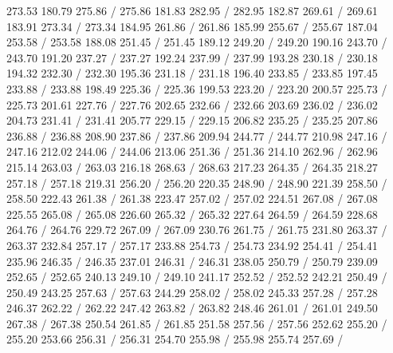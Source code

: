 { 273.53 180.79 275.86 /
 275.86 181.83 282.95 /
 282.95 182.87 269.61 /
 269.61 183.91 273.34 /
 273.34 184.95 261.86 /
 261.86 185.99 255.67 /
 255.67 187.04 253.58 /
 253.58 188.08 251.45 /
 251.45 189.12 249.20 /
 249.20 190.16 243.70 /
 243.70 191.20 237.27 /
 237.27 192.24 237.99 /
 237.99 193.28 230.18 /
 230.18 194.32 232.30 /
 232.30 195.36 231.18 /
 231.18 196.40 233.85 /
 233.85 197.45 233.88 /
 233.88 198.49 225.36 /
 225.36 199.53 223.20 /
 223.20 200.57 225.73 /
 225.73 201.61 227.76 /
 227.76 202.65 232.66 /
 232.66 203.69 236.02 /
 236.02 204.73 231.41 /
 231.41 205.77 229.15 /
 229.15 206.82 235.25 /
 235.25 207.86 236.88 /
 236.88 208.90 237.86 /
 237.86 209.94 244.77 /
 244.77 210.98 247.16 /
 247.16 212.02 244.06 /
 244.06 213.06 251.36 /
 251.36 214.10 262.96 /
 262.96 215.14 263.03 /
 263.03 216.18 268.63 /
 268.63 217.23 264.35 /
 264.35 218.27 257.18 /
 257.18 219.31 256.20 /
 256.20 220.35 248.90 /
 248.90 221.39 258.50 /
 258.50 222.43 261.38 /
 261.38 223.47 257.02 /
 257.02 224.51 267.08 /
 267.08 225.55 265.08 /
 265.08 226.60 265.32 /
 265.32 227.64 264.59 /
 264.59 228.68 264.76 /
 264.76 229.72 267.09 /
 267.09 230.76 261.75 /
 261.75 231.80 263.37 /
 263.37 232.84 257.17 /
 257.17 233.88 254.73 /
 254.73 234.92 254.41 /
 254.41 235.96 246.35 /
 246.35 237.01 246.31 /
 246.31 238.05 250.79 /
 250.79 239.09 252.65 /
 252.65 240.13 249.10 /
 249.10 241.17 252.52 /
 252.52 242.21 250.49 /
 250.49 243.25 257.63 /
 257.63 244.29 258.02 /
 258.02 245.33 257.28 /
 257.28 246.37 262.22 /
 262.22 247.42 263.82 /
 263.82 248.46 261.01 /
 261.01 249.50 267.38 /
 267.38 250.54 261.85 /
 261.85 251.58 257.56 /
 257.56 252.62 255.20 /
 255.20 253.66 256.31 /
 256.31 254.70 255.98 /
 255.98 255.74 257.69 /
}

